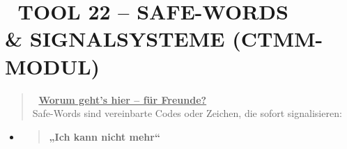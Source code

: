 \hypertarget{tool-22-safe-words-signalsysteme-ctmm-modul}{%
\section{\texorpdfstring{\textbf{🛑 TOOL 22 -- SAFE-WORDS \\& SIGNALSYSTEME (CTMM-MODUL)}}{🛑 TOOL 22 -- SAFE-WORDS \\& SIGNALSYSTEME (CTMM-MODUL)}}\label{tool-22-safe-words-signalsysteme-ctmm-modul}}

\begin{quote}
🧠 \textbf{\ul{Worum geht's hier -- für Freunde?}}\\
Safe-Words sind vereinbarte Codes oder Zeichen, die sofort signalisieren:
\end{quote}

\begin{itemize}
\item
  \begin{quote}
  \textbf{„Ich kann nicht mehr``}
  \end{quote}
\end{itemize}